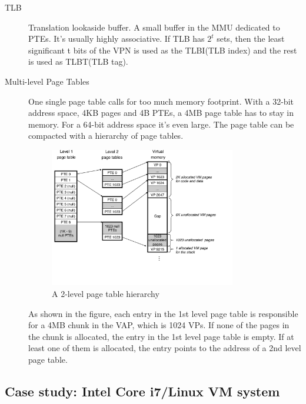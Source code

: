 \begin{description}
\item[TLB]Translation lookaside buffer. A small buffer in the MMU dedicated to PTEs. It's usually highly associative. If TLB has $2^t$ sets, then the least significant t bits of the VPN is used as the TLBI(TLB index) and the rest is used as TLBT(TLB tag).
\item[Multi-level Page Tables]One single page table calls for too much memory footprint. With a 32-bit address space, 4KB pages and 4B PTEs, a 4MB page table has to stay in memory. For a 64-bit address space it's even large. The page table can be compacted with a hierarchy of page tables. 
\begin{figure}[ht]
\centering
\includegraphics[width=0.8\textwidth]{multilevel.pdf}
\caption{A 2-level page table hierarchy}
\end{figure}

As shown in the figure, each entry in the 1st level page table is responsible for a 4MB chunk in the VAP, which is 1024 VPs. If none of the pages in the chunk is allocated, the entry in the 1st level page table is empty. If at least one of them is allocated, the entry points to the address of a 2nd level page table.
\end{description}
\subsection{Case study: Intel Core i7/Linux VM system}
